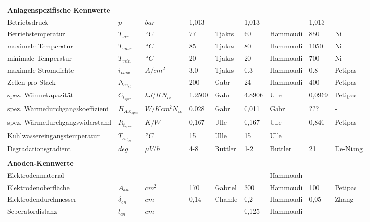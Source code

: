 \documentclass[onecolumn,10pt,titlepage]{article}
\begin{document}
\begin{table}[]
\begin{tabular*}{\textwidth}{lllllllll}
		\textbf{Anlagenspezifische Kennwerte}&&&&&&&& \\
		Betriebsdruck 							& $p$ 					& $bar$ 			& 1,013		& 	 		& 1,013 				& 	 		& 1,013					& 	 		\\
		Betriebstemperatur						& $T_{tar}$				& $\degree{C}$ 		& 77 		& Tjakrs	& 60 					& Hammoudi	& 850 					& Ni 		\\[2ex]
		maximale Temperatur						& $T_{max}$				& $\degree{C}$ 		& 85 		& Tjakrs	& 80 					& Hammoudi	& 1050 					& Ni 		\\
		minimale Temperatur						& $T_{min}$				& $\degree{C}$ 		& 20 		& Tjakrs	& 20 					& Hammoudi	& 700 					& Ni 		\\
		maximale Stromdichte 					& $i_{max}$ 			& $A/{cm^2}$ 		& 3.0 		& Tjakrs	& 0.3 					& Hammoudi	& 0.8 					& Petipas 	\\
		Zellen pro Stack						& $N_{ce_{st}}$			& -				 	& 200		& Gabr		& 24					& Hammoudi 	& 400 					& Petipas 	\\
		spez. Wärmekapazität					& $C_{t_{spec}}$		& $kJ/KN_{ce}$ 		& 1.2500	& Gabr		& 4.8906 				& Ulle		& 0,0969				& Petipas 	\\
		spez. Wärmedurchgangskoeffizient		& $H_{AX_{spec}}$		& $W/Kcm^{2}N_{ce}$				& 0.028		& Gabr					& 0,011 	& Gabr		& ??? 		& - 		\\
		spez. Wärmedurchgangswiderstand			& $R_{t_{spec}}$		& $K/W$				& 0,167 	& Ulle		& 0,167					& Ulle		& 0,840					& Petipas 	\\
		Kühlwassereingangstemperatur			& $T_{cw_{in}}$			& $\degree{C}$ 		& 15 		& Ulle		& 15 					& Ulle		& 	 					& 	 		\\	
		Degradationsgradient 					& $deg$ 				& ${\mu}V/h$		& 4-8 		& Buttler	& 1-2 					& Buttler	& 21 					& De-Niang 	\\
		
		&&&&&&&& \\
		\textbf{Anoden-Kennwerte}&&&&&&&& \\
		Elektrodenmaterial 						& - 					& -					& - 		& -	 		& - 					& Hammoudi	& - 					& -			\\
		Elektrodenoberfläche 					& $A_{an}$				& $cm^{2}$			& 170 		& Gabriel	& 300					& Hammoudi 	& 100 					& Petipas 	\\
		Elektrodendurchmesser 					& $\delta_{an}$			& $cm$ 				& 0,14 		& Chande 	& 0,2 					& Hammoudi	& 0,05 					& Zhang 	\\
		Seperatordistanz 						& $l_{an}$ 				& $cm$ 				& 	 		& 	 		& 0,125 				& Hammoudi	& 	 					& 			\\
		

\end{tabular*}
\end{table}
\end{document}
